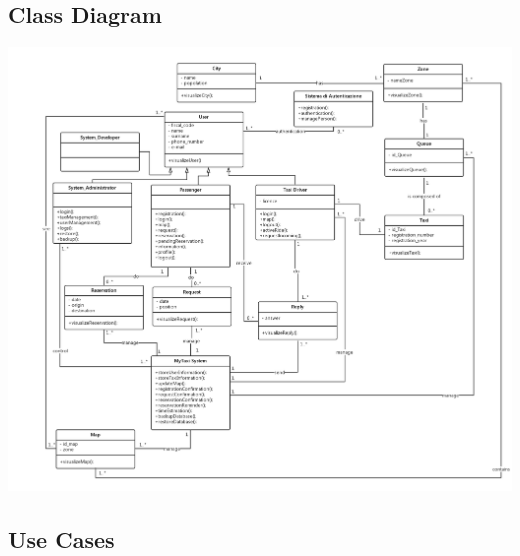 \documentclass[11pt, a4paper,titlepage]{article}
\begin{document}
\subsection{Class Diagram}
	 \includegraphics[width=\textwidth]{schema_class_diagram.png}
\pagebreak
\subsection{Use Cases}
\end{document}
